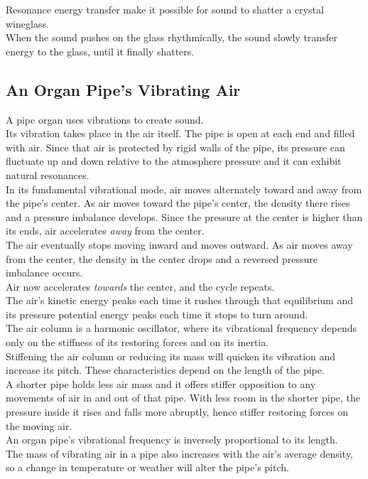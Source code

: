 \documentclass[12pt]{article}
\theoremstyle{definition}
\begin{document}
Resonance energy transfer make it possible for sound to shatter a crystal wineglass. \\
When the sound pushes on the glass rhythmically, the sound slowly transfer energy to the glass, until it finally shatters.

\subsection{An Organ Pipe's Vibrating Air}
A pipe organ uses vibrations to create sound. \\
Its vibration takes place in the air itself.
The pipe is open at each end and filled with air.
Since that air is protected by rigid walls of the pipe, its pressure can fluctuate up and down relative to the atmosphere pressure and it can exhibit natural resonances. \\

In its fundamental vibrational mode, air moves alternately toward and away from the pipe's center.
As air moves toward the pipe's center, the density there rises and a pressure imbalance develops.
Since the pressure at the center is higher than its ends, air accelerates \emph{away} from the center. \\
The air eventually stops moving inward and moves outward.
As air moves away from the center, the density in the center drops and a reversed pressure imbalance occurs. \\
Air now accelerates \emph{towards} the center, and the cycle repeats. \\
The air's kinetic energy peaks each time it rushes through that equilibrium and its pressure potential energy peaks each time it stops to turn around. \\

The air column is a harmonic oscillator, where its vibrational frequency depends only on the stiffness of its restoring forces and on its inertia. \\
Stiffening the air column or reducing its mass will quicken its vibration and increase its pitch.
These characteristics depend on the length of the pipe. \\
A shorter pipe holds less air mass and it offers stiffer opposition to any movements of air in and out of that pipe.
With less room in the shorter pipe, the pressure inside it rises and falls more abruptly, hence stiffer restoring forces on the moving air. \\
An organ pipe's vibrational frequency is inversely proportional to its length. \\
The mass of vibrating air in a pipe also increases with the air's average density, so a change in temperature or weather will alter the pipe's pitch. \\
\end{document}
